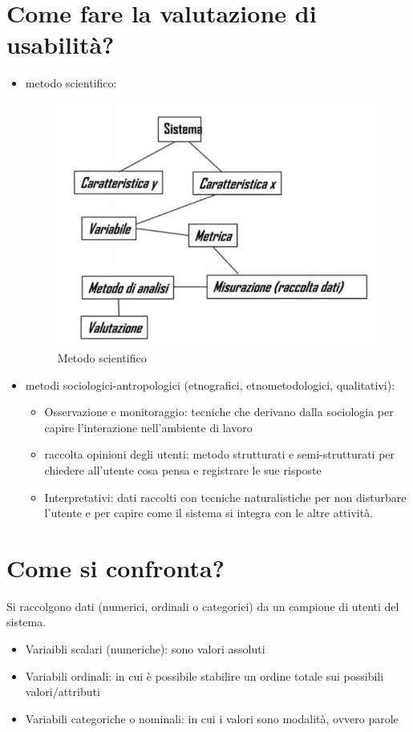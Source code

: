\documentclass[11pt,a4paper]{book}
\begin{document}
\section{Come fare la valutazione di usabilità?}
\begin{itemize}
	\item metodo scientifico:
	\begin{figure}[h!]
		\begin{center}
			\includegraphics[scale=0.6]{img/022.jpg}
			\caption{Metodo scientifico}
			\label{fig: 022}
		\end{center}
	\end{figure}
	\item metodi sociologici-antropologici (etnografici, etnometodologici, qualitativi):
	\begin{itemize}
		\item Osservazione e monitoraggio: tecniche che derivano dalla sociologia per capire l'interazione nell'ambiente di lavoro
		\item raccolta opinioni degli utenti: metodo strutturati e semi-strutturati per chiedere all'utente cosa pensa e registrare le sue risposte
		\item Interpretativi: dati raccolti con tecniche naturalistiche per non disturbare l'utente e per capire come il sistema si integra con le altre attività.
	\end{itemize}
\end{itemize}

\section{Come si confronta?}
Si raccolgono dati (numerici, ordinali o categorici) da un campione di utenti del sistema.
\begin{itemize}
	\item Variaibli scalari (numeriche): sono valori assoluti
	\item Variabili ordinali: in cui è possibile stabilire un ordine totale sui possibili valori/attributi
	\item Variabili categoriche o nominali: in cui i valori sono modalità, ovvero parole
\end{itemize}
\end{document}
